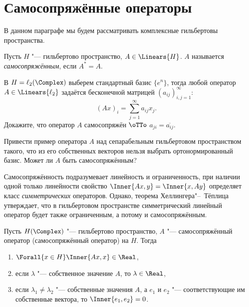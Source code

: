 \documentclass[main]{subfiles}
\begin{document}
\section{Самосопряжённые операторы}%

В данном параграфе мы будем рассматривать
комплексные гильбертовы пространства.

\begin{definition}
  Пусть $H$ "--- гильбертово пространство,
  $A \in \Linears{H}$. $A$ называется
  \emph{самосопряжённым}, если $A^* = A$.
\end{definition}

\begin{exercise}
  В \( H = \ell_2(\Complex) \)
  выберем стандартный базис \( \{ e^n \} \),
  тогда любой оператор \( A \in \Linears{\ell_2} \)
  задаётся бесконечной матрицей
  \( (a_{ij})_{i,j=1}^{\infty} \):
  \[
    (Ax)_i = \sum_{j=1}^\infty a_{ij} x_j.
  \]
  Докажите, что
  оператор \( A \) самосопряжён \( \oTTo \)
  \( a_{ji} = \overline{a_{ij}} \).
\end{exercise}

\begin{exercise}
  Привести пример оператора \( A \)
  над сепарабельным гильбертовом пространством такого,
  что из его собственных векторов нельзя выбрать
  ортонормированный базис.
  Может ли \( A \) быть самосопряжённым?
\end{exercise}

\begin{remark}
  Самосопряжённость подразумевает линейность и ограниченность,
  при наличии одной только линейности
  свойство $\Inner{Ax, y} = \Inner{x, Ay}$ определяет класс
  \emph{симметрических} операторов.
  Однако, теорема Хеллингера"--~Тёплица утверждает,
  что в гильбертовом пространстве
  симметрический линейный оператор будет также ограниченным,
  а потому и самосопряжённым.
\end{remark}

\begin{theorem}%
  Пусть \( H(\Complex) \) "--- гильбертово пространство,
  \( A \) "--- самосопряжённый оператор
  (самосопряжённый оператор) на \( H \). Тогда
  \begin{enumerate}
    \item \( \Forall{x \in H} \Inner{Ax, x} \in \Real \),
    \item если \( \lambda \) "--- собственное значение \( A \),
      то \( \lambda \in \Real \),
    \item если \( \lambda_1 \ne \lambda_2 \) "---
      собственные значения \( A \),
      а \( e_1 \) и \( e_2 \) "--- соответствующие им
      собственные вектора, то \( \Inner{e_1, e_2} = 0 \).
  \end{enumerate}
\end{theorem}
\end{document}
